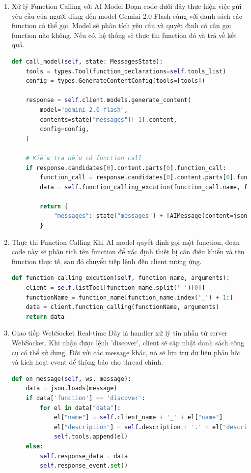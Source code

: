 \begin{enumerate}
    \item Xử lý Function Calling với AI Model \newline
    Đoạn code dưới đây thực hiện việc gửi yêu cầu của người dùng đến model Gemini 2.0 Flash cùng với danh sách các function có thể gọi. Model sẽ phân tích yêu cầu và quyết định có cần gọi function nào không. Nếu có, hệ thống sẽ thực thi function đó và trả về kết quả.
    \begin{lstlisting}[language=Python]
def call_model(self, state: MessagesState):
    tools = types.Tool(function_declarations=self.tools_list)
    config = types.GenerateContentConfig(tools=[tools])
    
    response = self.client.models.generate_content(
        model="gemini-2.0-flash",
        contents=state["messages"][-1].content,
        config=config,
    )
    
    # Kiểm tra nếu có function call
    if response.candidates[0].content.parts[0].function_call:
        function_call = response.candidates[0].content.parts[0].function_call
        data = self.function_calling_excution(function_call.name, function_call.args)
        
        return {
            "messages": state["messages"] + [AIMessage(content=json.dumps(data, ensure_ascii=False))]
        }
    \end{lstlisting}

    \item Thực thi Function Calling \newline
    Khi AI model quyết định gọi một function, đoạn code này sẽ phân tích tên function để xác định thiết bị cần điều khiển và tên function thực tế, sau đó chuyển tiếp lệnh đến client tương ứng.
    \begin{lstlisting}[language=Python]
def function_calling_excution(self, function_name, arguments):
    client = self.listTool[function_name.split('_')[0]]
    functionName = function_name[function_name.index('_') + 1:]
    data = client.function_calling(functionName, arguments)
    return data
    \end{lstlisting}
    
    \item Giao tiếp WebSocket Real-time \newline
    Đây là handler xử lý tin nhắn từ server WebSocket. Khi nhận được lệnh 'discover', client sẽ cập nhật danh sách công cụ có thể sử dụng. Đối với các message khác, nó sẽ lưu trữ dữ liệu phản hồi và kích hoạt event để thông báo cho thread chính.
    \begin{lstlisting}[language=Python]
def on_message(self, ws, message):
    data = json.loads(message)
    if data['function'] == 'discover':
        for el in data["data"]:
            el["name"] = self.client_name + '_' + el["name"]
            el["description"] = self.description + '.' + el["description"]
            self.tools.append(el)
    else:
        self.response_data = data
        self.response_event.set()
    \end{lstlisting}


\end{enumerate}
